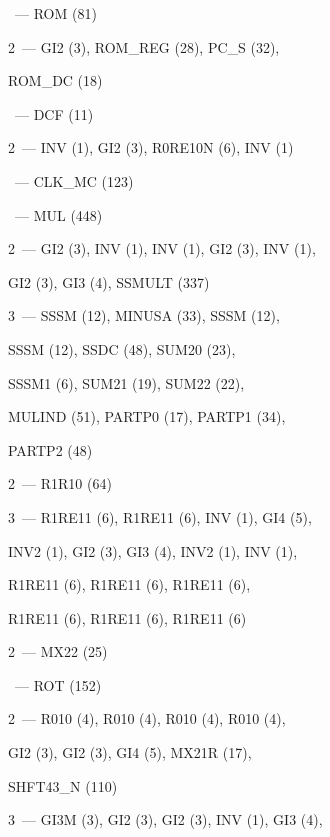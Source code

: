 \begin{multicols}{2}
  ~--- ROM (81)

     2~--- GI2 (3), ROM\_REG (28), PC\_S (32),

  \hspace*{4mm}ROM\_DC (18)

~--- DCF (11)

   2~--- INV (1), GI2 (3), R0RE10N (6), INV (1)

  ~--- CLK\_MC (123)

  ~--- MUL (448)

2~--- GI2 (3), INV (1), INV (1), GI2 (3), INV (1),

\hspace*{4mm}GI2 (3), GI3 (4), SSMULT (337)

  \hspace*{2mm}3~--- SSSM (12), MINUSA (33), SSSM (12),

  \hspace*{4mm}SSSM (12), SSDC (48), SUM20 (23),

  \hspace*{4mm}SSSM1 (6), SUM21 (19), SUM22 (22),

  \hspace*{4mm}MULIND (51), PARTP0 (17), PARTP1 (34),

  \hspace*{4mm}PARTP2 (48)

     2~--- R1R10 (64)

  \hspace*{2mm}3~--- R1RE11 (6), R1RE11 (6), INV (1), GI4 (5),

  \hspace*{4mm}INV2 (1), GI2 (3), GI3 (4), INV2 (1), INV (1),

  \hspace*{4mm}R1RE11 (6), R1RE11 (6), R1RE11 (6),

  \hspace*{4mm}R1RE11 (6), R1RE11 (6), R1RE11 (6)

     2~--- MX22 (25)

  ~--- ROT (152)

  2~--- R010 (4), R010 (4), R010 (4), R010 (4),

  \hspace*{4mm}GI2 (3), GI2 (3), GI4 (5), MX21R (17),

  \hspace*{4mm}SHFT43\_N (110)

  \hspace*{2mm}3~--- GI3M (3), GI2 (3), GI2 (3), INV (1), GI3 (4),


\end{multicols}
